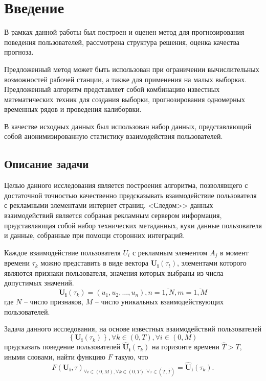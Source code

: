 \documentclass[a4paper, 14pt]{extreport}
\begin{document}
    \section{Введение}

    В рамках данной работы был построен и оценен метод для прогнозирования поведения пользователей, рассмотрена
    структура решения, оценка качества прогноза.

    Предложенный метод может быть использован при ограничении вычислительных возможностей рабочей станции, а также
    для применения на малых выборках.
    Предложенный алгоритм представляет собой комбинацию известных математических
    техник для создания выборки, прогнозирования одномерных временных рядов и проведения калиборвки.

    В качестве исходных данных был использован набор данных, представляющий собой анонимизированную статистику
    взаимодействия пользователей.

    \subsection*{Описание задачи}

    Целью данного исследования является построения алгоритма, позволявщего с достаточной точностью качественно
    предсказывать взаимодействие пользователя с рекламными элементами интернет страниц.
    <Следом>> данных взаимодействий является собраная рекламным сервером информация, представляющая собой набор
    технических метаданных, куки данные пользователя и данные, собранные при помощи сторонних интеграций.

    Каждое взаимодействие пользователя $U_i$ с рекламным элементом $A_j$ в момент времени $\tau_k$ можно представить
    в виде вектора $\mathbf{U_i}(\tau_t)$, элементами которого являются признаки пользователя, значения которых выбраны
    из числа допустимых значений.
    \begin{equation}
        \mathbf{U_i}\left(\tau_k\right) = \left( u_1, u_2, \dots, u_n \right), n = \overline{1, N}, m = \overline{1, M}
    \end{equation} где $N$ -- число признаков, $M$ -- число уникальных взаимодействующих пользователей.

    Задача данного исследования, на основе известных взаимодействий пользователей
    \begin{equation}
        \left\{ \mathbf{U_i}\left(\tau_k\right)\right\},
        \forall k \in \left(0, T\right),
        \forall i \in \left( 0, M \right)
    \end{equation}
    предсказать поведение пользователей $\mathbf{\widehat{U}_i}\left(\tau_k\right)$ на горизонте времени
    $\widehat{T} > T$, иными словами, найти функцию $F$ такую, что
    \begin{equation}
        F\left( \mathbf{U_i}, \tau \right)_{
        \forall i \in (0, M),
        \forall k \in \left(0, T\right),
        \forall \tau \in \left( T, \widehat{T} \right)}
        = \mathbf{\widehat{U}_i}\left(\tau_k\right).
    \end{equation}
\end{document}
